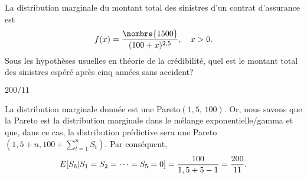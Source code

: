 \begin{exercice}
  La distribution marginale du montant total des sinistres d'un
  contrat d'assurance est
  \begin{equation*}
    f(x) = \frac{\nombre{1500}}{(100 + x)^{2,5}}, \quad x > 0.
  \end{equation*}
  Sous les hypothèses usuelles en théorie de la crédibilité, quel est
  le montant total des sinistres espéré après cinq années sans
  accident?
  \begin{rep}
    $200/11$
  \end{rep}
  \begin{sol}
    La distribution marginale donnée est une Pareto$(1,5,\, 100)$. Or,
    nous savons que la Pareto est la distribution marginale dans le
    mélange exponentielle/gamma et que, dans ce cas, la distribution
    prédictive sera une Pareto$(1,5 + n, 100 + \sum_{t=1}^n S_t)$. Par
    conséquent,
    \begin{equation*}
      E [ S_6|S_1 = S_2 = \dots = S_5 = 0 ]
      = \frac{100}{1,5 + 5 - 1}
      = \frac{200}{11}.
    \end{equation*}
  \end{sol}
\end{exercice}

